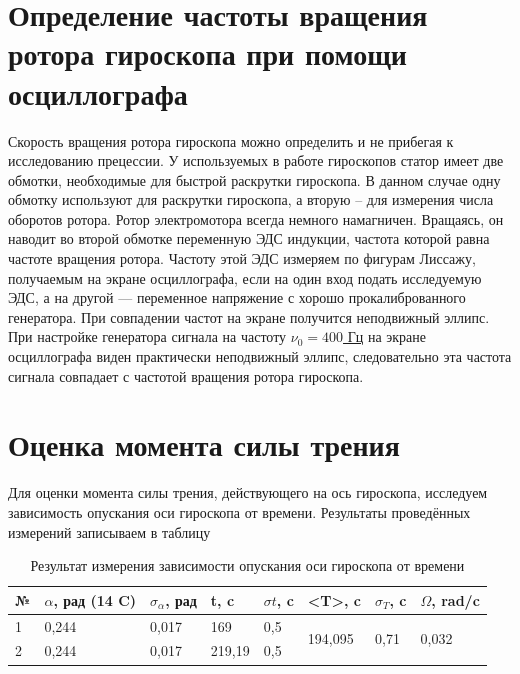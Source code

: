 \section{Определение частоты вращения ротора гироскопа при помощи осциллографа}

Скорость вращения ротора гироскопа можно определить и не прибегая к исследованию прецессии. У используемых в работе гироскопов статор имеет две обмотки, необходимые для быстрой раскрутки гироскопа. В данном случае одну обмотку используют для раскрутки гироскопа, а вторую -- для измерения числа оборотов ротора. Ротор электромотора всегда немного намагничен. Вращаясь, он наводит во второй обмотке переменную ЭДС индукции, частота которой равна частоте вращения ротора. Частоту этой ЭДС измеряем по фигурам Лиссажу, получаемым на экране осциллографа, если на один вход подать исследуемую ЭДС, а на другой — переменное напряжение с хорошо прокалиброванного генератора. При совпадении частот на экране получится неподвижный эллипс.\\
При настройке генератора сигнала на частоту \underline{$ \nu_0 = 400$ Гц} на экране осциллографа виден  практически неподвижный эллипс, следовательно эта частота сигнала совпадает с частотой вращения ротора гироскопа.


















\section{Оценка момента силы трения}

Для оценки момента силы трения, действующего на ось гироскопа, исследуем зависимость опускания оси гироскопа от времени. Результаты проведённых измерений записываем в таблицу 

\begin{table}[h!]
\centering
\begin{tabular}{|l|l|l|l|l|l|l|l|}
\hline
№ & $\alpha$, рад (14 C) & $\sigma_{\alpha}$, рад & t, c   & $\sigma t$, c & \textless{}T\textgreater{}, c & $\sigma_T$, c            & $\Omega$, rad/c           \\ \hline
1 & 0,244             & 0,017            & 169    & 0,5        & \multirow{2}{*}{194,095}      & \multirow{2}{*}{0,71} & \multirow{2}{*}{0,032} \\ \cline{1-5}
2 & 0,244             & 0,017            & 219,19 & 0,5        &                               &                       &                        \\ \hline
\end{tabular}
	\caption{Результат измерения зависимости опускания оси гироскопа от времени}
	\label{tab:my-table}
\end{table}

